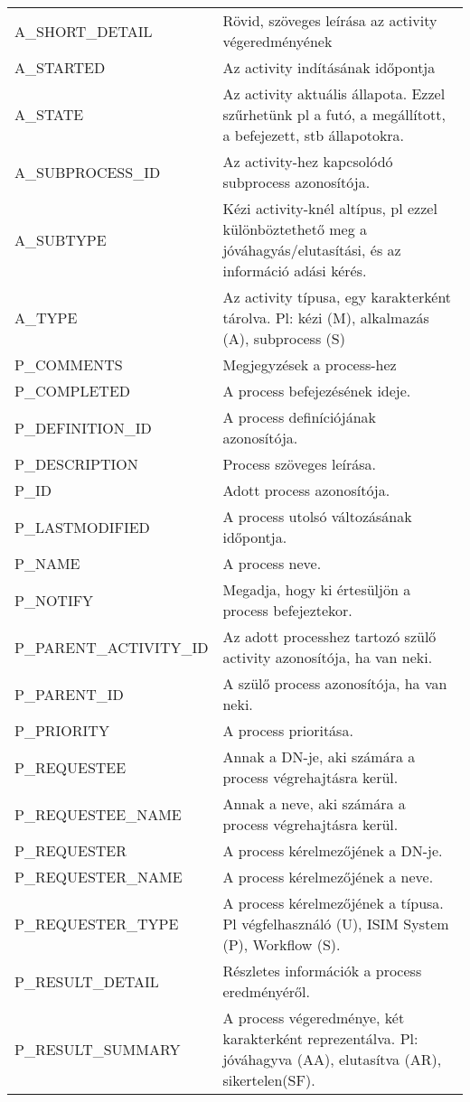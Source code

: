\begin{table}[htbp]
\begin{tabular}{p{.20\linewidth}p{.80\linewidth}}
		A\_SHORT\_DETAIL & Rövid, szöveges leírása az activity végeredményének \\
		A\_STARTED & Az activity indításának időpontja \\
		A\_STATE & Az activity aktuális állapota. Ezzel szűrhetünk pl a futó, a megállított, a befejezett, stb állapotokra. \\
		A\_SUBPROCESS\_ID & Az activity-hez kapcsolódó subprocess azonosítója. \\
		A\_SUBTYPE & Kézi activity-knél altípus, pl ezzel különböztethető meg a jóváhagyás/elutasítási, és az információ adási kérés. \\
		A\_TYPE & Az activity típusa, egy karakterként tárolva. Pl: kézi (M), alkalmazás (A), subprocess (S) \\
		P\_COMMENTS & Megjegyzések a process-hez \\
		P\_COMPLETED & A process befejezésének ideje. \\
		P\_DEFINITION\_ID & A process definíciójának azonosítója. \\
		P\_DESCRIPTION & Process szöveges leírása. \\
		P\_ID & Adott process azonosítója. \\
		P\_LASTMODIFIED & A process utolsó változásának időpontja. \\
		P\_NAME & A process neve. \\
		P\_NOTIFY & Megadja, hogy ki értesüljön a process befejeztekor. \\
		P\_PARENT\_ACTIVITY\_ID & Az adott processhez tartozó szülő activity azonosítója, ha van neki. \\
		P\_PARENT\_ID & A szülő process azonosítója, ha van neki. \\
		P\_PRIORITY & A process prioritása. \\
		P\_REQUESTEE & Annak a DN-je, aki számára a process végrehajtásra kerül. \\
		P\_REQUESTEE\_NAME & Annak a neve, aki számára a process végrehajtásra kerül. \\
		P\_REQUESTER & A process kérelmezőjének a DN-je. \\
		P\_REQUESTER\_NAME & A process kérelmezőjének a neve. \\
		P\_REQUESTER\_TYPE & A process kérelmezőjének a típusa. Pl végfelhasználó (U), ISIM System (P), Workflow (S). \\
		P\_RESULT\_DETAIL & Részletes információk a process eredményéről. \\
		P\_RESULT\_SUMMARY & A process végeredménye, két karakterként reprezentálva. Pl: jóváhagyva (AA), elutasítva (AR), sikertelen(SF). \\

\end{tabular}
\end{table}
